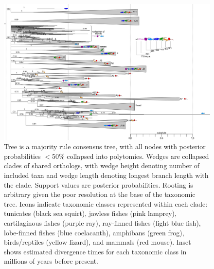 \begin{figure}
\centering
	\includegraphics{ch3-S3_fig.png} 
\caption[Bayesian phylogeny of the S100 protein family]{Tree is a majority rule consensus tree, with all nodes with posterior probabilities $<$50\% collapsed into polytomies. Wedges are collapsed clades of shared orthologs, with wedge height denoting number of included taxa and wedge length denoting longest branch length with the clade. Support values are posterior probabilities. Rooting is arbitrary given the poor resolution at the base of the taxonomic tree. Icons indicate taxonomic classes represented within each clade: tunicates (black sea squirt), jawless fishes (pink lamprey), cartilaginous fishes (purple ray), ray-finned fishes (light blue fish), lobe-finned fishes (blue coelacanth), amphibans (green frog), birds/reptiles (yellow lizard), and mammals (red mouse). Inset shows estimated divergence times for each taxonomic class in millions of years before present.\label{samplefigure}}	
\end{figure}


